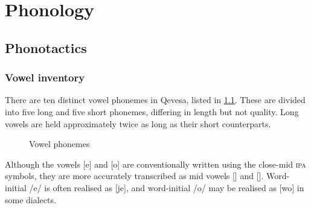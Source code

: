 \documentclass[grammar]{subfiles}
\begin{document}
  \chapter{Phonology}
  \label{ch:phonology}

  \section{Phonotactics}
  \label{sec:phonotactics}

  \subsection{Vowel inventory}
  \label{ssec:vowels}


  There are ten distinct vowel phonemes in Qevesa, listed in
  \cref{vowel_phonemes}.  These are divided into five long and five short
  phonemes, differing in length but not quality.  Long vowels are held
  approximately twice as long as their short counterparts.
  
  \begin{figure}[h]\capstart
    \begin{vowel}
    \end{vowel}
    \caption{Vowel phonemes\label{vowel_phonemes}}
  \end{figure}

  Although the vowels [e] and [o] are conventionally written using the
  close-mid \textsc{ipa} symbols, they are more accurately transcribed as mid
  vowels [] and [].  Word-initial /e/ is often
  realised as [je], and word-initial /o/ may be realised as [wo] in some dialects.
\end{document}

